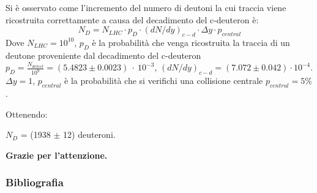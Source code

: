 \documentclass[11pt]{beamer}
\begin{document}
	\begin{frame}
		Si è osservato come l'incremento del numero di deutoni la cui traccia viene ricostruita correttamente a causa del decadimento del c-deuteron è:
		\begin{equation}
			N_D = N_{LHC} \cdot p_D \cdot (dN/dy)_{c-d} \cdot \Delta y \cdot p_{central}
		\end{equation}
		Dove $N_{LHC} = 10^{10}$, $p_D$ è la probabilità che venga ricostruita la traccia di un deutone proveniente dal decadimento del c-deuteron $p_D = \frac{N_{detect}}{10^9}= (5.4823 \pm 0.0023) \ \cdot \ 10^{-3}$, $(dN/dy)_{c-d}= (7.072 \pm 0.042) \cdot 10^{-4}$. $\Delta y = 1$, $p_{central}$ è la probabilità che si verifichi una collisione centrale $p_{central} = 5\%$. 
		
		Ottenendo:
		\begin{center}
			$N_D$ = (1938 $\pm$ 12) deuteroni.
		\end{center}
	\end{frame}
	
	
	\begin{frame}
		\centering
		\Huge{\textbf{Grazie per l'attenzione.}}\\[2ex]
	\end{frame}
	
	\begin{frame}
		\frametitle{Bibliografia}
		\printbibliography
	\end{frame}
	
	
	
\end{document}
